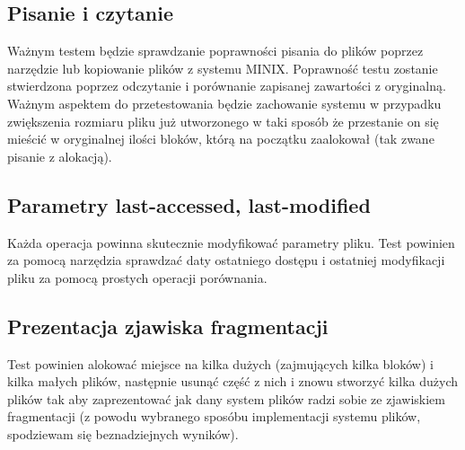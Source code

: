 \documentclass{mwrep}
\begin{document}
\subsection{Pisanie i czytanie}
Ważnym testem będzie sprawdzanie poprawności pisania do plików poprzez narzędzie lub kopiowanie plików z systemu MINIX. 
Poprawność testu zostanie stwierdzona poprzez odczytanie i porównanie zapisanej zawartości z oryginalną.
Ważnym aspektem do przetestowania będzie zachowanie systemu w przypadku zwiększenia rozmiaru pliku już utworzonego
w taki sposób że przestanie on się mieścić w oryginalnej ilości bloków, którą na początku zaalokował (tak zwane pisanie z alokacją).  

\subsection{Parametry last-accessed, last-modified}
Każda operacja powinna skutecznie modyfikować parametry pliku. Test powinien za pomocą narzędzia sprawdzać daty ostatniego
dostępu i ostatniej modyfikacji pliku za pomocą prostych operacji porównania. 

\subsection{Prezentacja zjawiska fragmentacji}
Test powinien alokować miejsce na kilka dużych (zajmujących kilka bloków) i kilka małych plików, następnie usunąć część z nich 
i znowu stworzyć kilka dużych plików tak aby zaprezentować jak dany system plików radzi sobie ze zjawiskiem fragmentacji 
(z powodu wybranego sposóbu implementacji systemu plików, spodziewam się beznadziejnych wyników).
\end{document}
